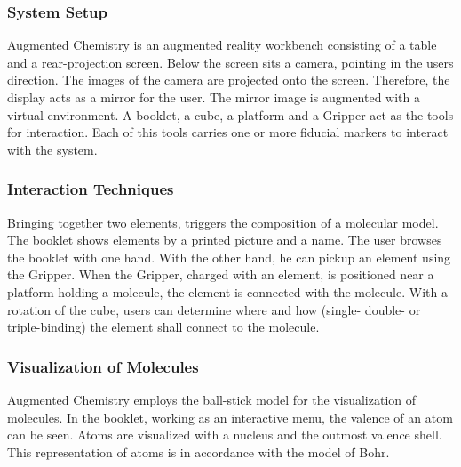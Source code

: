 \subsubsection{System Setup}
Augmented Chemistry is an augmented reality workbench consisting of a table and a rear-projection screen. Below the screen sits a camera, pointing in the users direction. The images of the camera are projected onto the screen. Therefore, the display acts as a mirror for the user. The mirror image is augmented with a virtual environment. A booklet, a cube, a platform and a Gripper act as the tools for interaction. Each of this tools carries one or more fiducial markers to interact with the system. 

\subsubsection{Interaction Techniques}
Bringing together two elements, triggers the composition of a molecular model. The booklet shows elements by a printed picture and a name. The user browses the booklet with one hand. With the other hand, he can pickup an element using the Gripper. When the Gripper, charged with an element, is positioned near a platform holding a molecule, the element is connected with the molecule. With a rotation of the cube, users can determine where and how (single- double- or triple-binding) the element shall connect to the molecule. 

\subsubsection{Visualization of Molecules}
Augmented Chemistry employs the ball-stick model for the visualization of molecules. In the booklet, working as an interactive menu, the valence of an atom can be seen. Atoms are visualized with a nucleus and the outmost valence shell. This representation of atoms is in accordance with the model of Bohr. 